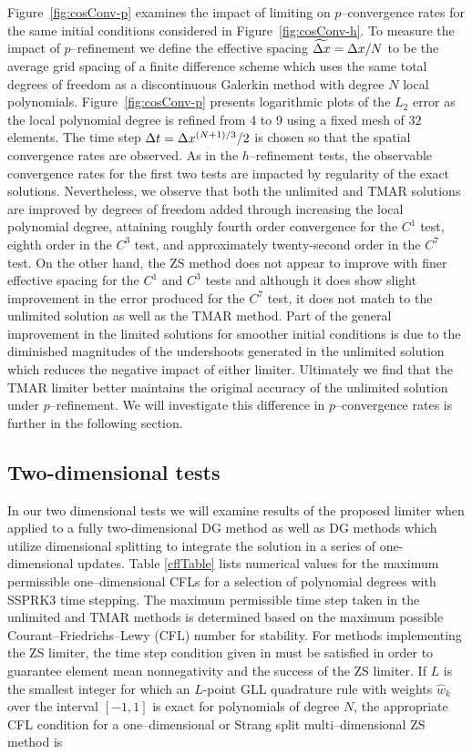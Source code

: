 \documentclass{ametsoc}
\begin{document}
Figure~\ref{fig:cosConv-p} examines the impact of limiting on $p$--convergence rates for the same initial conditions considered in Figure~\ref{fig:cosConv-h}. To measure the impact of $p$--refinement we define the effective spacing $\widetilde{\Delta x} = \Delta x/N$ to be the average grid spacing of a finite difference scheme which uses the same total degrees of freedom as a discontinuous Galerkin method with degree $N$ local polynomials. Figure~\ref{fig:cosConv-p} presents logarithmic plots of the $L_2$ error as the local polynomial degree is refined from 4 to 9 using a fixed mesh of $32$ elements. The time step $\Delta t = \Delta x^{(N+1)/3}/2$ is chosen so that the spatial convergence rates are observed. As in the $h$--refinement tests, the observable convergence rates for the first two tests are impacted by regularity of the exact solutions. Nevertheless, we observe that both the unlimited and TMAR solutions are improved by degrees of freedom added through increasing the local polynomial degree, attaining roughly fourth order convergence for the $C^1$ test, eighth order in the $C^3$ test, and approximately twenty-second order in the $C^7$ test. On the other hand, the ZS method does not appear to improve with finer effective spacing for the $C^1$ and $C^3$ tests and although it does show slight improvement in the error produced for the $C^7$ test, it does not match to the unlimited solution as well as the TMAR method. Part of the general improvement in the limited solutions for smoother initial conditions is due to the diminished magnitudes of the undershoots generated in the unlimited solution which reduces the negative impact of either limiter. Ultimately we find that the TMAR limiter better maintains the original accuracy of the unlimited solution under $p$--refinement. We will investigate this difference in $p$--convergence rates is further in the following section.

\subsection*{Two-dimensional tests}

In our two dimensional tests we will examine results of the proposed limiter when applied to a fully two-dimensional DG method as well as DG methods which utilize dimensional splitting \citep{strang68} to integrate the solution in a series of one-dimensional updates. Table \ref{cflTable} lists numerical values for the maximum permissible one--dimensional CFLs for a selection of polynomial degrees with SSPRK3 time stepping. The maximum permissible time step taken in the unlimited and TMAR methods is determined based on the maximum possible Courant--Friedrichs--Lewy (CFL) number for stability. For methods implementing the ZS limiter, the time step condition given in \citep{Zhang2010} must be satisfied in order to guarantee element mean nonnegativity and the success of the ZS limiter. If $L$ is the smallest integer for which an $L$-point GLL quadrature rule with weights $\hat{w}_k$ over the interval $[-1,1]$ is exact for polynomials of degree $N$, the appropriate CFL condition for a one--dimensional or Strang split multi--dimensional ZS method is
\end{document}
